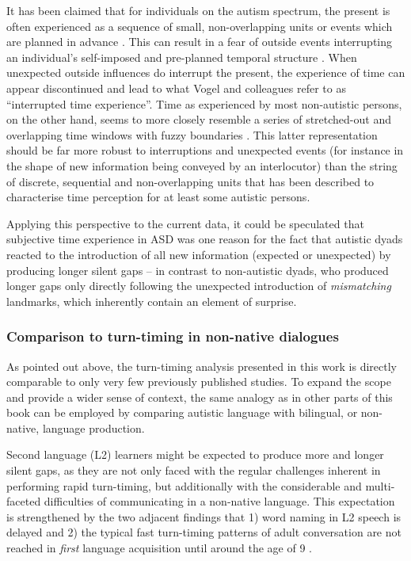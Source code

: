 It has been claimed that for individuals on the autism spectrum, the present is often experienced as a sequence of small, non-overlapping units or events which are planned in advance \citep[broadly in line with theories of Weak Central Coherence; ][]{frithAutismExplainingEnigma2003,happeExploringCognitivePhenotype2001}. This can result in a fear of outside events interrupting an individual's self-imposed and pre-planned temporal structure \citep{vogelInterruptedTimeExperience2019}. When unexpected outside influences do interrupt the present, the experience of time can appear discontinued and lead to what Vogel and colleagues refer to as ``interrupted time experience''. Time as experienced by most non-autistic persons, on the other hand, seems to more closely resemble a series of stretched-out and overlapping time windows with fuzzy boundaries \citep{vogelFlowStructureTime2020}. This latter representation should be far more robust to interruptions and unexpected events (for instance in the shape of new information being conveyed by an interlocutor) than the string of discrete, sequential and non-overlapping units that has been described to characterise time perception for at least some autistic persons.

Applying this perspective to the current data, it could be speculated that subjective time experience in ASD was one reason for the fact that autistic dyads reacted to the introduction of all new information (expected or unexpected) by producing longer silent gaps -- in contrast to non-autistic dyads, who produced longer gaps only directly following the unexpected introduction of \emph{mismatching} landmarks, which inherently contain an element of surprise.

\subsubsection{Comparison to turn-timing in non-native dialogues}\label{turntaking_conclusion_discussion_L2}


	As pointed out above, the turn-timing analysis presented in this work is directly comparable to only very few previously published studies. To expand the scope and provide a wider sense of context, the same analogy as in other parts of this book can be employed by comparing autistic language with bilingual, or non-native, language production.

Second language (L2) learners might be expected to produce more and longer silent gaps, as they are not only faced with the regular challenges inherent in performing rapid turn-timing, but additionally with the considerable and multi-faceted difficulties of communicating in a non-native language. This expectation is strengthened by the two adjacent findings that 1) word naming in L2 speech is delayed \citep{hanulovaWhereDoesDelay2011} and 2) the typical fast turn-timing patterns of adult conversation are not reached in \emph{first} language acquisition until around the age of 9 \citep{casillasTurnTakingTiming2016,garveyTimingTurnTaking1981}.

